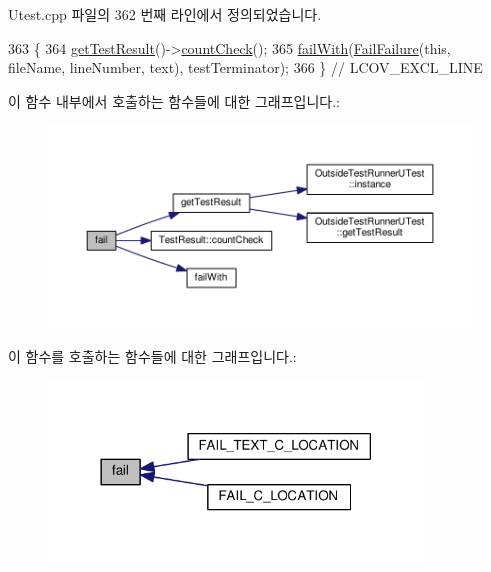 Utest.\+cpp 파일의 362 번째 라인에서 정의되었습니다.


\begin{DoxyCode}
363 \{
364     \hyperlink{class_utest_shell_a34c525b685e30431750d9e355fdfff0c}{getTestResult}()->\hyperlink{class_test_result_a58577489a2418efb4c440761e533f2e7}{countCheck}();
365     \hyperlink{class_utest_shell_ad50ae28f5ad9f1d224832cb1f89365a7}{failWith}(\hyperlink{class_fail_failure}{FailFailure}(\textcolor{keyword}{this}, fileName, lineNumber, text), testTerminator);
366 \} \textcolor{comment}{// LCOV\_EXCL\_LINE}
\end{DoxyCode}


이 함수 내부에서 호출하는 함수들에 대한 그래프입니다.\+:
\nopagebreak
\begin{figure}[H]
\begin{center}
\leavevmode
\includegraphics[width=350pt]{class_utest_shell_a551151a34264d19c3954dab0948ea186_cgraph}
\end{center}
\end{figure}




이 함수를 호출하는 함수들에 대한 그래프입니다.\+:
\nopagebreak
\begin{figure}[H]
\begin{center}
\leavevmode
\includegraphics[width=282pt]{class_utest_shell_a551151a34264d19c3954dab0948ea186_icgraph}
\end{center}
\end{figure}


